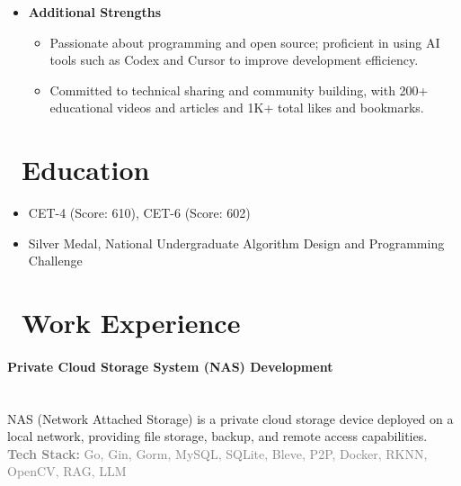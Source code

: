 \documentclass{resume}
\begin{document}
\begin{itemize}
    \item \textbf{Additional Strengths}
    \begin{itemize}
        \item Passionate about programming and open source; proficient in using AI tools such as Codex and Cursor to improve development efficiency.
        \item Committed to technical sharing and community building, with 200+ educational videos and articles and 1K+ total likes and bookmarks.
    \end{itemize}
\end{itemize}

\section{\faGraduationCap\ Education}
\begin{itemize}
\item CET-4 (Score: 610), CET-6 (Score: 602)
\item Silver Medal, National Undergraduate Algorithm Design and Programming Challenge
\end{itemize}

\section{\faSuitcase\ Work Experience}

\paragraph*{Private Cloud Storage System (NAS) Development}\mbox{}\\
{\small
\noindent NAS (Network Attached Storage) is a private cloud storage device deployed on a local network, providing file storage, backup, and remote access capabilities.\\
\noindent\textcolor{gray}{\textbf{Tech Stack:} Go, Gin, Gorm, MySQL, SQLite, Bleve, P2P, Docker, RKNN, OpenCV, RAG, LLM}
}
\vspace{0.3ex}
\vspace{0.3ex}
\end{document}
